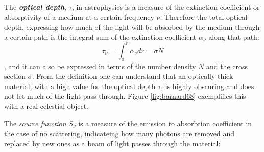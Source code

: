 The \textbf{\textit{optical depth}}, $\tau$, in astrophysics is a measure of the extinction coefficient or absorptivity of a medium at a certain frequency $\nu$. Therefore the total optical depth, expressing how much of the light will be absorbed by the medium through a certain path is the integral sum of the extinction coefficient 	$\alpha_{\nu}$ along that path: 
\begin{equation}\label{eq:optical-depth}
	\tau_{\nu} = \int_0^r \alpha_{\nu} dr = \sigma N
\end{equation},
%
and it can also be expressed in terms of the number density $N$ and the cross section $\sigma$. From the definition one can understand that an optically thick material, with a high value for the optical depth $\tau$, is highly obscuring and does not let much of the light pass through. Figure \ref{fig:barnard68} exemplifies this with a real celestial object. 

The \textit{source function} $S_\nu$ is a measure of the emission to absorbtion coefficient in the case of no scattering, indicateing how many photons are removed and replaced by new ones as a beam of light passes through the material:

